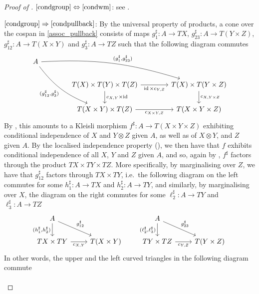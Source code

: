 \documentclass[a4paper,UKenglish,numberwithinsect,cleveref, autoref, thm-restate]{lipics-v2021}
\theoremstyle{plain} %
\theoremstyle{definition} %
\begin{document}
\begin{proof}[Proof of ]
 $\ref{condgroup}\Leftrightarrow\ref{condwm}$: 
 see .
 
 $\ref{condgroup}\Rightarrow\ref{condpullback}$: 
 By the universal property of products, a cone over the cospan in \eqref{assoc_pullback} consists of maps $g_1^\sharp:A\to TX$, $g_{23}^\sharp:A\to T(Y\times Z)$, $g_{12}^\sharp:A\to T(X\times Y)$ and $g_3^\sharp:A\to TZ$ such that the following diagram commutes
 \[
  \begin{tikzcd}[column sep=3.3pc]
   A \ar[bend left=10]{drr}{(g_1^\sharp,g_{23}^\sharp)} \ar[bend right=15]{ddr}[swap]{(g_{12}^\sharp,g_3^\sharp)} \\
   & T(X) \times T(Y) \times T(Z) \ar{r}[swap]{\id \times c_{Y,Z}} \ar{d}{c_{X,Y} \times \id}	& T(X) \times T(Y \times Z) \ar{d}{c_{X,Y \times Z}}	\\
   & T(X \times Y) \times T(Z) \ar{r}[swap]{c_{X\times Y,Z}}						& T(X \times Y \times Z)
  \end{tikzcd}
 \]
 By , this amounts to a Kleisli morphism $f^\sharp:A\to T(X\times Y\times Z)$ exhibiting conditional independence of $X$ and $Y\otimes Z$ given $A$, as well as of $X\otimes Y$, and $Z$ given $A$. By the localised independence property (), we then have that $f$ exhibits conditional independence of all $X$, $Y$ and $Z$ given $A$, and so, again by , $f^\sharp$ factors through the product $TX\times TY\times TZ$. 
 More specifically, by marginalising over $Z$, we have that $g_{12}^\sharp$ factors through $TX\times TY$, i.e.~the following diagram on the left commutes for some $h_1^\sharp:A\to TX$ and $h_2^\sharp:A\to TY$, and similarly, by marginalising over $X$, the diagram on the right commutes for some $\ell_2^\sharp:A\to TY$ and $\ell_3^\sharp:A\to TZ$
 \[
  \begin{tikzcd}
   A \ar{d}[swap]{(h_1^\sharp,h_2^\sharp)} \ar{dr}{g_{12}^\sharp} \\
   TX\times TY \ar{r}[swap]{c_{X,Y}} & T(X\times Y) 
  \end{tikzcd}
  \qquad
  \begin{tikzcd}
   A \ar{d}[swap]{(\ell_2^\sharp,\ell_3^\sharp)} \ar{dr}{g_{23}^\sharp} \\
   TY\times TZ \ar{r}[swap]{c_{Y,Z}} & T(Y\times Z) 
  \end{tikzcd}
 \]
 In other words, the upper and the left curved triangles in the following diagram commute
\[
  \begin{tikzcd}[column sep=3.3pc]

\end{tikzcd}\]
\end{proof}
\end{document}
